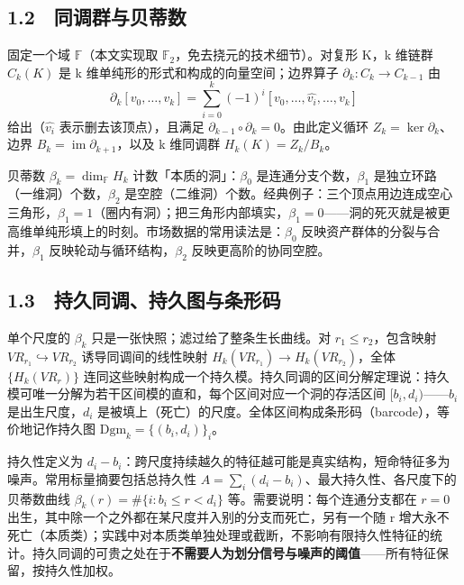 \documentclass[12pt,a4paper]{ctexart}
\begin{document}
\subsection{1.2　同调群与贝蒂数}
固定一个域 \(\mathbb{F}\)（本文实现取 \(\mathbb{F}_2\)，免去挠元的技术细节）。对复形 K，k 维链群 \(C_k(K)\) 是 k 维单纯形的形式和构成的向量空间；边界算子 \(\partial_k : C_k \to C_{k-1}\) 由
\[
\partial_k[v_0,\ldots,v_k] = \sum_{i=0}^{k} (-1)^i [v_0,\ldots,\widehat{v_i},\ldots,v_k]
\]
给出（\(\widehat{v_i}\) 表示删去该顶点），且满足 \(\partial_{k-1} \circ \partial_k = 0\)。由此定义循环 \(Z_k = \ker \partial_k\)、边界 \(B_k = \operatorname{im} \partial_{k+1}\)，以及 k 维同调群 \(H_k(K) = Z_k / B_k\)。\par
贝蒂数 \(\beta_k = \dim_{\mathbb{F}} H_k\) 计数「本质的洞」：\(\beta_0\) 是连通分支个数，\(\beta_1\) 是独立环路（一维洞）个数，\(\beta_2\) 是空腔（二维洞）个数。经典例子：三个顶点用边连成空心三角形，\(\beta_1 = 1\)（圈内有洞）；把三角形内部填实，\(\beta_1 = 0\)——洞的死灭就是被更高维单纯形填上的时刻。市场数据的常用读法是：\(\beta_0\) 反映资产群体的分裂与合并，\(\beta_1\) 反映轮动与循环结构，\(\beta_2\) 反映更高阶的协同空腔。\par
\subsection{1.3　持久同调、持久图与条形码}
单个尺度的 \(\beta_k\) 只是一张快照；滤过给了整条生长曲线。对 \(r_1 \le r_2\)，包含映射 \(VR_{r_1} \hookrightarrow VR_{r_2}\) 诱导同调间的线性映射 \(H_k(VR_{r_1}) \to H_k(VR_{r_2})\)，全体 \(\{H_k(VR_r)\}\) 连同这些映射构成一个持久模。持久同调的区间分解定理说：持久模可唯一分解为若干区间模的直和，每个区间对应一个洞的存活区间 \([b_i, d_i)\)——\(b_i\) 是出生尺度，\(d_i\) 是被填上（死亡）的尺度。全体区间构成条形码（barcode），等价地记作持久图 \(\mathrm{Dgm}_k = \{(b_i, d_i)\}_i\)。\par
持久性定义为 \(d_i - b_i\)：跨尺度持续越久的特征越可能是真实结构，短命特征多为噪声。常用标量摘要包括总持久性 \(A = \sum_i (d_i - b_i)\)、最大持久性、各尺度下的贝蒂数曲线 \(\beta_k(r) = \#\{i : b_i \le r < d_i\}\) 等。需要说明：每个连通分支都在 \(r = 0\) 出生，其中除一个之外都在某尺度并入别的分支而死亡，另有一个随 r 增大永不死亡（本质类）；实践中对本质类单独处理或截断，不影响有限持久性特征的统计。持久同调的可贵之处在于\textbf{不需要人为划分信号与噪声的阈值}——所有特征保留，按持久性加权。\par
\end{document}

